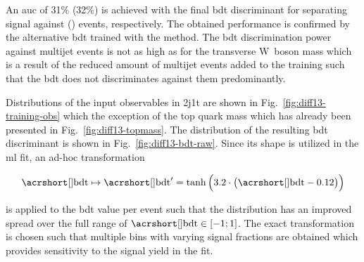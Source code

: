 An \gls{auc} of 31\% (32\%) is achieved with the final \gls{bdt} discriminant for separating signal against \ttbar (\wjets) events, respectively. The obtained performance is confirmed by the alternative \gls{bdt} trained with the \GRADIENTBOOST method. The \gls{bdt} discrimination power against multijet events is not as high as for the transverse W~boson mass which is a result of the reduced amount of multijet events added to the training such that the \gls{bdt} does not discriminates against them predominantly.

Distributions of the input observables in 2j1t are shown in Fig.~\ref{fig:diff13-training-obs} which the exception of the top quark mass which has already been presented in Fig.~\ref{fig:diff13-topmass}. The distribution of the resulting \gls{bdt} discriminant is shown in Fig.~\ref{fig:diff13-bdt-raw}. Since its shape is utilized in the \gls{ml} fit, an ad-hoc transformation 

\begin{equation}
\bdt\mapsto\bdt^\prime=\tanh\Big(3.2\cdot\big(\bdt-0.12\big)\Big)
\end{equation}

is applied to the \gls{bdt} value per event such that the distribution has an improved spread over the full range of $\bdt\in[-1;1]$. The exact transformation is chosen such that multiple bins with varying signal fractions are obtained which provides sensitivity to the signal yield in the fit.


